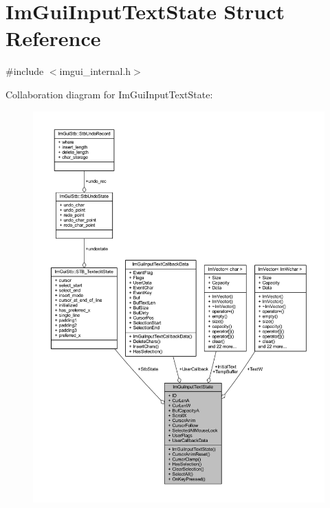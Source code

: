 \hypertarget{struct_im_gui_input_text_state}{}\section{Im\+Gui\+Input\+Text\+State Struct Reference}
\label{struct_im_gui_input_text_state}


{\ttfamily \#include $<$imgui\+\_\+internal.\+h$>$}



Collaboration diagram for Im\+Gui\+Input\+Text\+State\+:
\nopagebreak
\begin{figure}[H]
\begin{center}
\leavevmode
\includegraphics[width=350pt]{struct_im_gui_input_text_state__coll__graph}
\end{center}
\end{figure}
